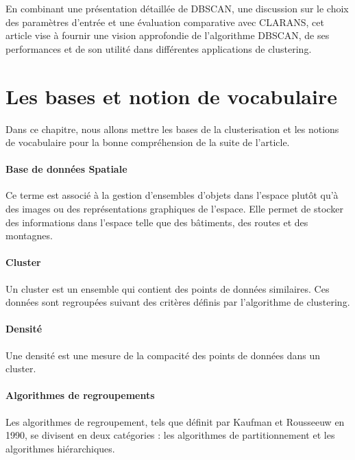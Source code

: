 \documentclass[
  oneside]{memoire-umons}
\begin{document}
En combinant une présentation détaillée de DBSCAN, une discussion sur le
choix des paramètres d'entrée et une évaluation comparative avec
CLARANS, cet article vise à fournir une vision approfondie de
l'algorithme DBSCAN, de ses performances et de son utilité dans
différentes applications de clustering.

\chapter{Les bases et notion de vocabulaire}

Dans ce chapitre, nous allons mettre les bases de la clusterisation et
les notions de vocabulaire pour la bonne compréhension de la suite de
l'article.

\hypertarget{base-de-donnuxe9es-spatiale}{%
\subsubsection{Base de données
Spatiale}\label{base-de-donnuxe9es-spatiale}}

Ce terme est associé à la gestion d'ensembles d'objets dans l'espace
plutôt qu'à des images ou des représentations graphiques de l'espace.
Elle permet de stocker des informations dans l'espace telle que des
bâtiments, des routes et des montagnes.

\hypertarget{cluster}{%
\subsubsection{Cluster}\label{cluster}}

Un cluster est un ensemble qui contient des points de données
similaires. Ces données sont regroupées suivant des critères définis par
l'algorithme de clustering.

\hypertarget{densituxe9}{%
\subsubsection{Densité}\label{densituxe9}}

Une densité est une mesure de la compacité des points de données dans un
cluster.

\hypertarget{algorithmes-de-regroupements}{%
\subsubsection{Algorithmes de
regroupements}\label{algorithmes-de-regroupements}}

Les algorithmes de regroupement, tels que définit par Kaufman et
Rousseeuw en 1990, se divisent en deux
catégories : les algorithmes de partitionnement et les algorithmes
hiérarchiques.
\end{document}
